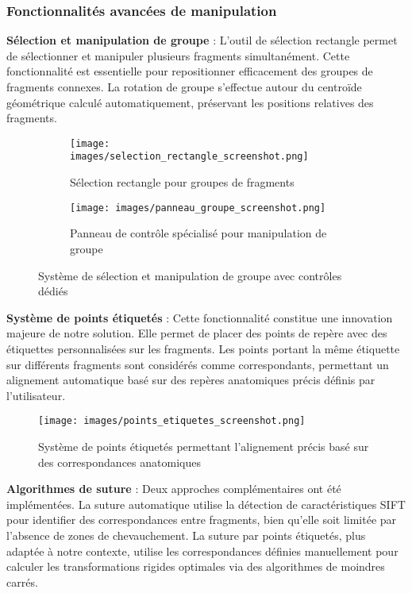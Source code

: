 \subsubsection{Fonctionnalités avancées de manipulation}

\textbf{Sélection et manipulation de groupe} : L'outil de sélection rectangle permet de sélectionner et manipuler plusieurs fragments simultanément. Cette fonctionnalité est essentielle pour repositionner efficacement des groupes de fragments connexes. La rotation de groupe s'effectue autour du centroïde géométrique calculé automatiquement, préservant les positions relatives des fragments.

\begin{figure}[H]
\centering
\begin{subfigure}{0.48\textwidth}
\texttt{[image: images/selection\_rectangle\_screenshot.png]}
\caption{Sélection rectangle pour groupes de fragments}
\end{subfigure}
\hfill
\begin{subfigure}{0.48\textwidth}
\texttt{[image: images/panneau\_groupe\_screenshot.png]}
\caption{Panneau de contrôle spécialisé pour manipulation de groupe}
\end{subfigure}
\caption{Système de sélection et manipulation de groupe avec contrôles dédiés}
\label{fig:selection_groupe}
\end{figure}

\textbf{Système de points étiquetés} : Cette fonctionnalité constitue une innovation majeure de notre solution. Elle permet de placer des points de repère avec des étiquettes personnalisées sur les fragments. Les points portant la même étiquette sur différents fragments sont considérés comme correspondants, permettant un alignement automatique basé sur des repères anatomiques précis définis par l'utilisateur.

\begin{figure}[H]
\centering
\texttt{[image: images/points\_etiquetes\_screenshot.png]}
\caption{Système de points étiquetés permettant l'alignement précis basé sur des correspondances anatomiques}
\label{fig:points_etiquetes}
\end{figure}

\textbf{Algorithmes de suture} : Deux approches complémentaires ont été implémentées. La suture automatique utilise la détection de caractéristiques SIFT pour identifier des correspondances entre fragments, bien qu'elle soit limitée par l'absence de zones de chevauchement. La suture par points étiquetés, plus adaptée à notre contexte, utilise les correspondances définies manuellement pour calculer les transformations rigides optimales via des algorithmes de moindres carrés.

